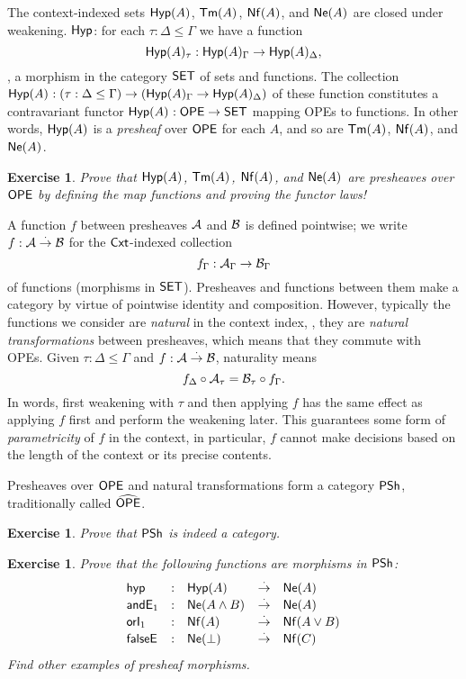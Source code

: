 \documentclass[a4paper]{article}
\newtheorem{exercise}[theorem]{Exercise}
\begin{document}
The context-indexed sets $\Hyp A$, $\Tm A$, $\Nf A$, and $\Ne A$ are
closed under weakening. \Eg{} $\tHyp$: for each $\tau : \Delta \leq \Gamma$
we have a function
\[
  \Hyp[\tau]A : \Hyp[\Gamma] A \to \Hyp[\Delta] A,
\]
\ie, a morphism in the category $\SET$ of sets and functions.
The collection $\Hyp A : (\tau : \Delta \leq \Gamma) \to
(\Hyp[\Gamma]A \to \Hyp[\Delta]A)$ of these function constitutes a
contravariant functor $\Hyp A : \OPE \to \SET$ mapping OPEs to
functions.  In other words, $\Hyp A$ is a \emph{presheaf} over $\OPE$
for each $A$, and so are $\Tm A$, $\Nf A$, and $\Ne A$.

\begin{exercise}
  Prove that $\Hyp A$, $\Tm A$, $\Nf A$, and $\Ne A$ are presheaves
  over $\OPE$ by defining the map functions and proving the functor laws!
\end{exercise}

A function $f$ between presheaves $\A$ and $\B$ is defined pointwise;
we write $f : \A \todot \B$ for the $\Cxt$-indexed collection
\[
  f_\Gamma : \A_\Gamma \to \B_\Gamma
\]
of functions (morphisms in $\SET$). Presheaves and functions between
them make a category by virtue of pointwise identity and composition.
However, typically the functions we consider are \emph{natural} in the
context index, \ie, they are \emph{natural transformations} between
presheaves, which means that they commute with OPEs.  Given $\tau :
\Delta \leq \Gamma$ and $f : \A \todot \B$, naturality means
\[
  f_\Delta \comp \A_\tau = \B_\tau \comp f_\Gamma .
\]
In words, first weakening with $\tau$ and then applying $f$ has the
same effect as applying $f$ first and perform the weakening later.
This guarantees some form of \emph{parametricity} of $f$ in the
context, in particular, $f$ cannot make decisions based on the length
of the context or its precise contents.

Presheaves over $\OPE$ and natural transformations form a category
$\PSh$, traditionally called $\widehat{\OPE}$.

\begin{exercise}
  Prove that $\PSh$ is indeed a category.
\end{exercise}

\begin{exercise}
  Prove that the following functions are morphisms in $\PSh$:
\[
\begin{array}{lllll}
  \thyp & : & \Hyp A & \todot & \Ne A \\
  \tandE1 & : & \Ne{A \land B} & \todot & \Ne A \\
  \torI1  & : & \Nf A & \todot & \Nf{A \lor B} \\
  \tfalseE & : & \Ne \bot & \todot & \Nf C \\
\end{array}
\]
  Find other examples of presheaf morphisms.
\end{exercise}
\end{document}
